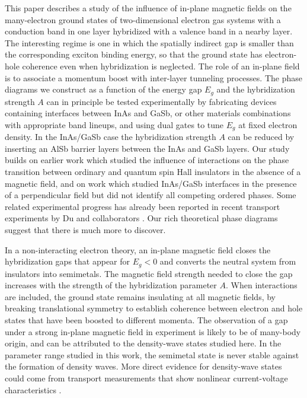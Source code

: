 \documentclass[reprint,aps,superscriptaddress]{revtex4-2}
\begin{document}
This paper describes a study of the influence of in-plane magnetic fields on the 
many-electron ground states of two-dimensional electron gas systems with a conduction band 
in one layer hybridized with a valence band in a nearby layer.  The interesting regime is one in which 
the spatially indirect gap is smaller than the corresponding exciton binding energy, so that 
the ground state has electron-hole coherence even when hybridization is neglected.
The role of an in-plane field is to associate a momentum boost with inter-layer tunneling processes.
The phase diagrams we construct as a function of the energy gap $E_g$ and the hybridization strength 
$A$ can in principle be tested experimentally by fabricating devices containing interfaces 
between InAs and GaSb, or other materials combinations with appropriate band lineups,
and using dual gates to tune $E_g$ at fixed electron density.  In the InAs/GaSb case
the hybridization strength $A$ can be reduced by inserting an AlSb barrier layers \cite{wu2019electrically,wu2019resistive} 
between the InAs and GaSb layers.  Our study builds on earlier work \cite{xue2018time} which studied
the influence of interactions on the phase transition between ordinary and quantum spin Hall insulators
in the absence of a magnetic field, and on work \cite{hu2017topological} which studied InAs/GaSb interfaces 
in the presence of a perpendicular field but did not identify all competing ordered phases.
Some related experimental progress has already been reported 
in recent transport experiments by Du and collaborators \cite{du2017evidence,wu2019electrically,wu2019resistive}.
Our rich theoretical phase diagrams suggest that there is much more to discover.

In a non-interacting electron theory, an in-plane magnetic field closes 
the hybridization gaps that appear for $E_g<0$ and converts the 
neutral system from insulators into semimetals.  The magnetic field strength needed to 
close the gap increases with the strength of the hybridization parameter $A$.
When interactions are included, the ground state remains insulating at all magnetic fields, by breaking 
translational symmetry to establish coherence between electron and hole states that have been boosted to different momenta.  
The observation of a gap under a strong in-plane magnetic field in experiment \cite{du2017evidence,wu2019resistive} 
is likely to be of many-body origin, and can be attributed to the density-wave states studied here. 
In the parameter range studied in this work, the semimetal state is never stable against the 
formation of density waves.  More direct evidence for density-wave states could come from transport measurements that show nonlinear current-voltage characteristics \cite{gruner1988dynamics,lee1974conductivity,fukuyama1978dynamics,lee1979electric}.
\end{document}
